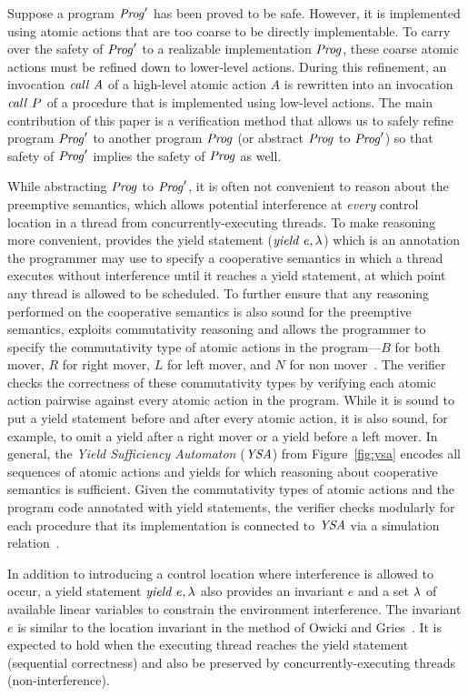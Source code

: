 Suppose a program $\mathit{Prog}'$ has been proved to be safe.
However, it is implemented using atomic actions that are too coarse to be directly implementable.  
To carry over the safety of $\mathit{Prog}'$ to a realizable implementation $\mathit{Prog}$, 
these coarse atomic actions must be refined down to lower-level actions.
During this refinement, an invocation $\mathit{call}\ A$ of a high-level atomic action $A$ is rewritten into an 
invocation $\mathit{call}\ P$ of a procedure that is implemented using low-level actions.
The main contribution of this paper is a verification method that allows us to safely refine
program $\mathit{Prog}'$ to another program $\mathit{Prog}$ (or abstract $\mathit{Prog}$ to $\mathit{Prog}'$) so that 
safety of $\mathit{Prog}'$ implies the safety of $\mathit{Prog}$ as well.

While abstracting $\mathit{Prog}$ to $\mathit{Prog}'$, it is often not convenient to 
reason about the preemptive semantics, which allows potential interference 
at {\em every\/} control location in a thread from concurrently-executing threads.
To make reasoning more convenient, \civl provides the yield statement ($\mathit{yield}\ e,\lambda$) which is an annotation 
the programmer may use to specify a cooperative semantics in which a thread executes without 
interference until it reaches a yield statement, at which point any thread is allowed to be scheduled.
To further ensure that any reasoning performed on the cooperative semantics is also sound for the preemptive semantics,
\civl exploits commutativity reasoning and allows the programmer to specify 
the commutativity type of atomic actions in the program---$B$ for both mover, $R$ for right mover, $L$ for left mover, 
and $N$ for non mover~\cite{FlanaganFLQ08}. 
The \civl verifier checks the correctness of these commutativity types by verifying each atomic action pairwise against 
every atomic action in the program.
While it is sound to put a yield statement before and after every atomic action,
it is also sound, for example, to omit a yield after a right mover or a yield before a left mover.
In general, the {\em Yield Sufficiency Automaton\/} ($\mathit{YSA}$) from Figure~\ref{fig:ysa} encodes 
all sequences of atomic actions and yields for which reasoning about cooperative semantics is sufficient.
Given the commutativity types of atomic actions and the program code annotated with yield statements,
the \civl verifier checks modularly for each procedure that its implementation is connected to $\mathit{YSA}$
via a simulation relation~\cite{HenzingerHK95}.

In addition to introducing a control location where interference is allowed to occur, 
a yield statement $\mathit{yield}\ e,\lambda$ also provides an invariant $e$ and a set $\lambda$ of available linear variables
to constrain the environment interference.
The invariant $e$ is similar to the location invariant in the method of Owicki and Gries~\cite{OwickiG76}.
It is expected to hold when the executing thread reaches the yield statement (sequential correctness) 
and also be preserved by concurrently-executing threads (non-interference).


